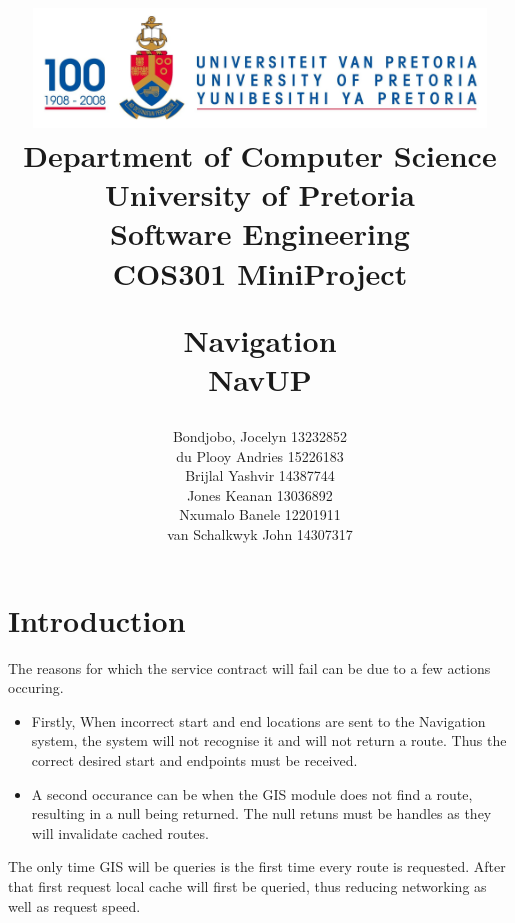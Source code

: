 \documentclass[a4paper,10pt]{article}
\title{\includegraphics[width=12cm]{Eeufeeslogo.jpg} \\
       Department of Computer Science \\
       University of Pretoria \\
       \vspace{0.5cm}
       Software Engineering\\
       COS301 MiniProject \\
       \vspace{0.5cm}
       \begin{large} \textbf{Navigation}\\ NavUP\end{large}}
\date{}
\author{Bondjobo, Jocelyn 	13232852 \\
	du Plooy Andries		15226183 \\
	Brijlal	Yashvir		14387744 \\
	Jones	Keanan		13036892 \\	
	Nxumalo Banele		12201911 \\
	van Schalkwyk John	14307317 \\
}
\begin{document}
\maketitle
\thispagestyle{empty}
\clearpage

\newpage
{}
\thispagestyle{empty}
\tableofcontents
\clearpage

\newpage
{}

\section{Introduction}
The reasons for which the service contract will fail can be due to a few actions occuring. 
\begin{itemize}

\item Firstly, When incorrect start and end locations are sent to the Navigation system, the system will not recognise it and will not return a route. Thus the correct desired start and endpoints must be received.


\item  A second occurance can be when the GIS module does not find a route, resulting in a null being returned. The null retuns must be handles as they will invalidate cached routes.
\end{itemize}

The only time GIS will be queries is the first time every route is requested. After that first request local cache will first be queried, thus reducing networking as well as request speed.
\end{document}
